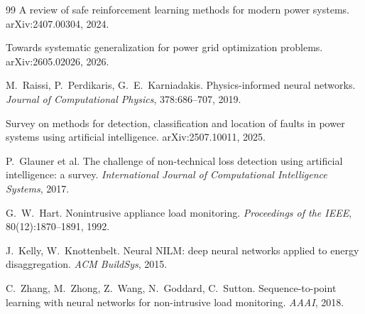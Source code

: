 \documentclass[11pt,a4paper]{article}
\begin{document}
\begin{thebibliography}{99}
A review of safe reinforcement learning methods for modern power systems.
arXiv:2407.00304, 2024.

Towards systematic generalization for power grid optimization problems.
arXiv:2605.02026, 2026.

M.~Raissi, P.~Perdikaris, G.~E.~Karniadakis. Physics-informed neural
networks. \textit{Journal of Computational Physics}, 378:686--707, 2019.

Survey on methods for detection, classification and location of faults in
power systems using artificial intelligence. arXiv:2507.10011, 2025.

P.~Glauner et al. The challenge of non-technical loss detection using
artificial intelligence: a survey. \textit{International Journal of
Computational Intelligence Systems}, 2017.

G.~W.~Hart. Nonintrusive appliance load monitoring. \textit{Proceedings of
the IEEE}, 80(12):1870--1891, 1992.

J.~Kelly, W.~Knottenbelt. Neural NILM: deep neural networks applied to energy
disaggregation. \textit{ACM BuildSys}, 2015.

C.~Zhang, M.~Zhong, Z.~Wang, N.~Goddard, C.~Sutton. Sequence-to-point
learning with neural networks for non-intrusive load monitoring.
\textit{AAAI}, 2018.

\end{thebibliography}
\end{document}
